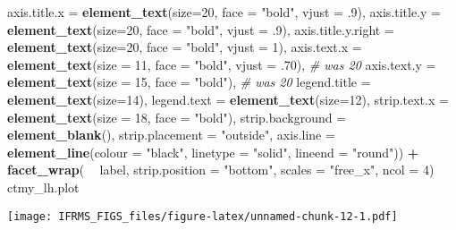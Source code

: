 \documentclass[
]{article}
\newenvironment{Shaded}{\begin{snugshade}}{\end{snugshade}}
\newcommand{\CommentTok}[1]{\textcolor[rgb]{0.56,0.35,0.01}{\textit{#1}}}
\newcommand{\DataTypeTok}[1]{\textcolor[rgb]{0.13,0.29,0.53}{#1}}
\newcommand{\DecValTok}[1]{\textcolor[rgb]{0.00,0.00,0.81}{#1}}
\newcommand{\FloatTok}[1]{\textcolor[rgb]{0.00,0.00,0.81}{#1}}
\newcommand{\KeywordTok}[1]{\textcolor[rgb]{0.13,0.29,0.53}{\textbf{#1}}}
\newcommand{\NormalTok}[1]{#1}
\newcommand{\OperatorTok}[1]{\textcolor[rgb]{0.81,0.36,0.00}{\textbf{#1}}}
\newcommand{\StringTok}[1]{\textcolor[rgb]{0.31,0.60,0.02}{#1}}
\begin{document}
\begin{Shaded}
\begin{Highlighting}[]
          \DataTypeTok{axis.title.x =} \KeywordTok{element_text}\NormalTok{(}\DataTypeTok{size=}\DecValTok{20}\NormalTok{, }\DataTypeTok{face =} \StringTok{"bold"}\NormalTok{, }\DataTypeTok{vjust =} \FloatTok{.9}\NormalTok{),}
          \DataTypeTok{axis.title.y =} \KeywordTok{element_text}\NormalTok{(}\DataTypeTok{size=}\DecValTok{20}\NormalTok{, }\DataTypeTok{face =} \StringTok{"bold"}\NormalTok{, }\DataTypeTok{vjust =} \FloatTok{.9}\NormalTok{),}
          \DataTypeTok{axis.title.y.right =} \KeywordTok{element_text}\NormalTok{(}\DataTypeTok{size=}\DecValTok{20}\NormalTok{, }\DataTypeTok{face =} \StringTok{"bold"}\NormalTok{, }\DataTypeTok{vjust =} \DecValTok{1}\NormalTok{),}
          \DataTypeTok{axis.text.x =} \KeywordTok{element_text}\NormalTok{(}\DataTypeTok{size =} \DecValTok{11}\NormalTok{, }\DataTypeTok{face =} \StringTok{"bold"}\NormalTok{, }\DataTypeTok{vjust =} \FloatTok{.70}\NormalTok{), }\CommentTok{# was 20}
          \DataTypeTok{axis.text.y =} \KeywordTok{element_text}\NormalTok{(}\DataTypeTok{size =} \DecValTok{15}\NormalTok{, }\DataTypeTok{face =} \StringTok{"bold"}\NormalTok{), }\CommentTok{# was 20}
          \DataTypeTok{legend.title =} \KeywordTok{element_text}\NormalTok{(}\DataTypeTok{size=}\DecValTok{14}\NormalTok{), }
          \DataTypeTok{legend.text =} \KeywordTok{element_text}\NormalTok{(}\DataTypeTok{size=}\DecValTok{12}\NormalTok{),}
          \DataTypeTok{strip.text.x =} \KeywordTok{element_text}\NormalTok{(}\DataTypeTok{size =} \DecValTok{18}\NormalTok{, }\DataTypeTok{face =} \StringTok{"bold"}\NormalTok{),}
          \DataTypeTok{strip.background =} \KeywordTok{element_blank}\NormalTok{(),}
          \DataTypeTok{strip.placement =} \StringTok{"outside"}\NormalTok{,}
          \DataTypeTok{axis.line =} \KeywordTok{element_line}\NormalTok{(}\DataTypeTok{colour =} \StringTok{"black"}\NormalTok{, }\DataTypeTok{linetype =} \StringTok{"solid"}\NormalTok{, }\DataTypeTok{lineend =} \StringTok{"round"}\NormalTok{)) }\OperatorTok{+}
\StringTok{  }\KeywordTok{facet_wrap}\NormalTok{( }\OperatorTok{~}\StringTok{ }\NormalTok{label, }\DataTypeTok{strip.position =} \StringTok{"bottom"}\NormalTok{, }\DataTypeTok{scales =} \StringTok{"free_x"}\NormalTok{, }\DataTypeTok{ncol =} \DecValTok{4}\NormalTok{)}
\NormalTok{ctmy_lh.plot}
\end{Highlighting}
\end{Shaded}

\texttt{[image: IFRMS\_FIGS\_files/figure-latex/unnamed-chunk-12-1.pdf]}
\end{document}
